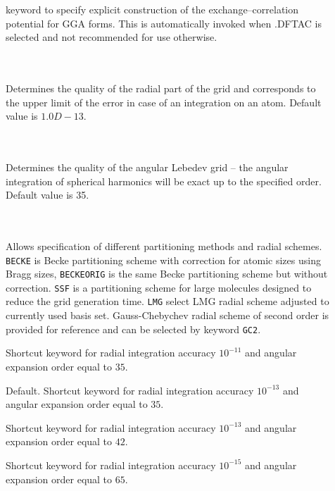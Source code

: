 \begin{description}
\item[]
  keyword to specify explicit construction of the exchange--correlation 
  potential for GGA forms. This is automatically invoked when .DFTAC is selected 
  and not recommended for use otherwise.

\item[] \ \\
   \\
  Determines the quality of the radial part of the grid and
  corresponds to the upper limit of the error in case of an
  integration on an atom. Default value is $1.0D-13$.

\item[] \ \\
   \\
  Determines the quality of the angular Lebedev grid -- the angular
  integration of spherical harmonics will be exact up to the specified
  order. Default value is 35.

\item[] \ \\
   \\
  Allows specification of different partitioning methods and radial
  schemes. \verb|BECKE| is Becke partitioning scheme with correction
  for atomic sizes using Bragg sizes, \verb|BECKEORIG| is the same
  Becke partitioning scheme but without correction. \verb|SSF| is a
  partitioning scheme for large molecules designed to reduce the grid
  generation time. \verb|LMG| select LMG radial scheme adjusted to
  currently used basis set. Gauss-Chebychev radial scheme of second
  order is provided for reference and can be selected by keyword
  \verb|GC2|.

\item[]
  Shortcut keyword for radial integration accuracy $10^{-11}$ and
  angular expansion order equal to $35$.
\item[]
  Default. Shortcut keyword for radial integration accuracy $10^{-13}$ and
  angular expansion order equal to $35$.
\item[]
  Shortcut keyword for radial integration accuracy $10^{-13}$ and
  angular expansion order equal to $42$.
\item[]
  Shortcut keyword for radial integration accuracy $10^{-15}$ and
  angular expansion order equal to $65$.

\end{description}

